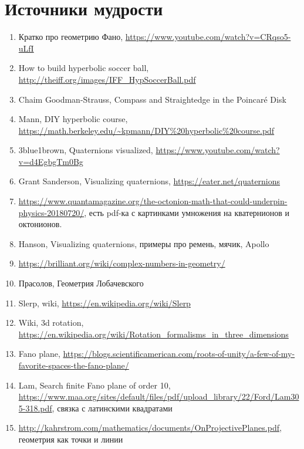 \documentclass[12pt]{article}
\theoremstyle{definition}
\begin{document}
\section{Источники мудрости}


\begin{enumerate}
\item Кратко про геометрию Фано, \url{https://www.youtube.com/watch?v=CRqso5-uLfI}
\item How to build hyperbolic soccer ball, \url{http://theiff.org/images/IFF_HypSoccerBall.pdf}
\item Chaim Goodman-Strauss, Compass and Straightedge in the Poincaré Disk
\item Mann, DIY hyperbolic course, \url{https://math.berkeley.edu/~kpmann/DIY%20hyperbolic%20course.pdf}
\item 3blue1brown, Quaternions visualized, \url{https://www.youtube.com/watch?v=d4EgbgTm0Bg}
\item Grant Sanderson, Visualizing quaternions, \url{https://eater.net/quaternions}
\item \url{https://www.quantamagazine.org/the-octonion-math-that-could-underpin-physics-20180720/}, есть pdf-ка
с картинками умножения на кватернионов и октонионов. 
\item Hanson, Visualizing quaternions, примеры про ремень, мячик, Apollo
\item \url{https://brilliant.org/wiki/complex-numbers-in-geometry/}
\item Прасолов, Геометрия Лобачевского
\item Slerp, wiki, \url{https://en.wikipedia.org/wiki/Slerp}
\item Wiki, 3d rotation, \url{https://en.wikipedia.org/wiki/Rotation_formalisms_in_three_dimensions}
\item Fano plane, \url{https://blogs.scientificamerican.com/roots-of-unity/a-few-of-my-favorite-spaces-the-fano-plane/}
\item Lam, Search finite Fano plane of order 10, \url{https://www.maa.org/sites/default/files/pdf/upload_library/22/Ford/Lam305-318.pdf},
связка с латинскими квадратами
\item \url{http://kahrstrom.com/mathematics/documents/OnProjectivePlanes.pdf}, геометрия как точки и линии

\end{enumerate}

\printbibliography[heading=none]
\end{document}
